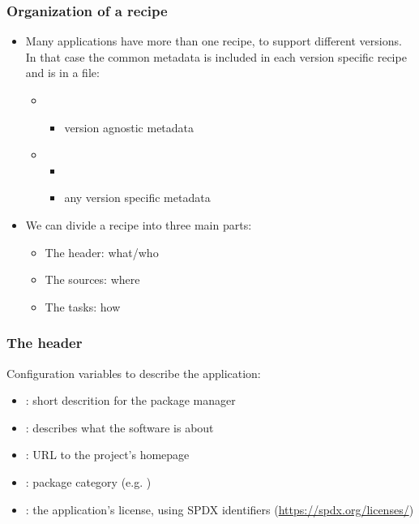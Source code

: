 \begin{frame}
  \frametitle{Organization of a recipe}
  \begin{itemize}
    \item Many applications have more than one recipe, to support
      different versions. In that case the common metadata is
      included in each version specific recipe and is in a 
      file:
      \begin{itemize}
        \item {}
          \begin{itemize}
            \item version agnostic metadata
          \end{itemize}
        \item {}
          \begin{itemize}
            \item {}
            \item any version specific metadata
          \end{itemize}
      \end{itemize}
    \item We can divide a recipe into three main parts:
      \begin{itemize}
        \item The header: what/who
        \item The sources: where
        \item The tasks: how
      \end{itemize}
  \end{itemize}
\end{frame}

\begin{frame}
  \frametitle{The header}
  Configuration variables to describe the application:
  \begin{itemize}
    \item {}: short descrition for the package manager
    \item {}: describes what the software is about
    \item {}: URL to the project's homepage
    \item {}: package category (e.g. )
    \item {}: the application's license, using SPDX identifiers
      (\url{https://spdx.org/licenses/})
  \end{itemize}
\end{frame}

